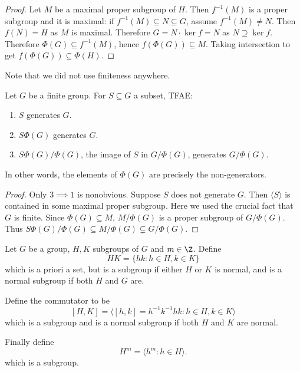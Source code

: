 \documentclass[a4paper]{article}
\begin{document}
\begin{proof}
  Let \(M\) be a maximal proper subgroup of \(H\). Then \(f^{-1}(M)\) is a proper subgroup and it is maximal: if \(f^{-1}(M) \subseteq N \subseteq G\), assume \(f^{-1}(M) \ne N\). Then \(f(N) = H\) as \(M\) is maximal. Therefore \(G = N \cdot \ker f = N\) as \(N \supseteq \ker f\). Therefore \(\Phi(G) \subseteq f^{-1}(M)\), hence \(f(\Phi(G)) \subseteq M\). Taking intersection to get \(f(\Phi(G)) \subseteq \Phi(H)\).
\end{proof}

Note that we did not use finiteness anywhere.

\begin{proposition}
  Let \(G\) be a finite group. For \(S \subseteq G\) a subset, TFAE:
  \begin{enumerate}
  \item \(S\) generates \(G\).
  \item \(S \Phi(G)\) generates \(G\).
  \item \(S \Phi(G)/\Phi(G)\), the image of \(S\) in \(G/\Phi(G)\), generates \(G/\Phi(G)\).
  \end{enumerate}
\end{proposition}

In other words, the elements of \(\Phi(G)\) are precisely the non-generators.

\begin{proof}
  Only \(3 \implies 1\) is nonobvious. Suppose \(S\) does not generate \(G\). Then \(\langle S\rangle\) is contained in some maximal proper subgroup. Here we used the crucial fact that \(G\) is finite. Since \(\Phi(G) \subseteq M\), \(M/\Phi(G)\) is a proper subgroup of \(G/\Phi(G)\). Thus \(S \Phi(G)/\Phi(G) \subseteq M/\Phi(G) \subsetneq G/\Phi(G)\).
\end{proof}

\begin{definition}
  Let \(G\) be a group, \(H, K\) subgroups of \(G\) and \(m \in \Z\). Define
  \[
    HK = \{hk: h \in H, k \in K\}
  \]
  which is a priori a set, but is a subgroup if either \(H\) or \(K\) is normal, and is a normal subgroup if both \(H\) and \(G\) are.

  Define the commutator to be
  \[
    [H, K] = \langle [h, k] = h^{-1}k^{-1}hk: h \in H, k \in K \rangle
  \]
  which is a subgroup and is a normal subgroup if both \(H\) and \(K\) are normal.

  Finally define
  \[
    H^m = \langle h^m: h \in H\rangle.
  \]
  which is a subgroup.
\end{definition}
\end{document}
